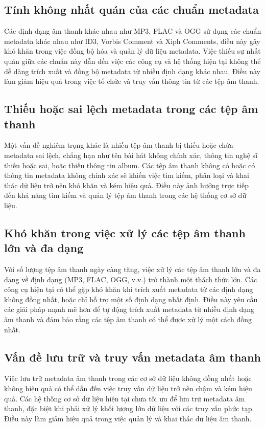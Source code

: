\documentclass[conference]{IEEEtran}
\begin{document}
\subsection{Tính không nhất quán của các chuẩn metadata}

Các định dạng âm thanh khác nhau như MP3, FLAC và OGG sử dụng các chuẩn metadata khác nhau như ID3, Vorbis Comment và Xiph Comments, điều này gây khó khăn trong việc đồng bộ hóa và quản lý dữ liệu metadata. Việc thiếu sự nhất quán giữa các chuẩn này dẫn đến việc các công cụ và hệ thống hiện tại không thể dễ dàng trích xuất và đồng bộ metadata từ nhiều định dạng khác nhau. Điều này làm giảm hiệu quả trong việc tổ chức và truy vấn thông tin từ các tệp âm thanh.

\subsection{Thiếu hoặc sai lệch metadata trong các tệp âm thanh}

Một vấn đề nghiêm trọng khác là nhiều tệp âm thanh bị thiếu hoặc chứa metadata sai lệch, chẳng hạn như tên bài hát không chính xác, thông tin nghệ sĩ thiếu hoặc sai, hoặc thiếu thông tin album. Các tệp âm thanh không có hoặc có thông tin metadata không chính xác sẽ khiến việc tìm kiếm, phân loại và khai thác dữ liệu trở nên khó khăn và kém hiệu quả. Điều này ảnh hưởng trực tiếp đến khả năng tìm kiếm và quản lý tệp âm thanh trong các hệ thống cơ sở dữ liệu.

\subsection{Khó khăn trong việc xử lý các tệp âm thanh lớn và đa dạng}

Với số lượng tệp âm thanh ngày càng tăng, việc xử lý các tệp âm thanh lớn và đa dạng về định dạng (MP3, FLAC, OGG, v.v.) trở thành một thách thức lớn. Các công cụ hiện tại có thể gặp khó khăn khi trích xuất metadata từ các định dạng không đồng nhất, hoặc chỉ hỗ trợ một số định dạng nhất định. Điều này yêu cầu các giải pháp mạnh mẽ hơn để tự động trích xuất metadata từ nhiều định dạng âm thanh và đảm bảo rằng các tệp âm thanh có thể được xử lý một cách đồng nhất.

\subsection{Vấn đề lưu trữ và truy vấn metadata âm thanh}

Việc lưu trữ metadata âm thanh trong các cơ sở dữ liệu không đồng nhất hoặc không hiệu quả có thể dẫn đến việc truy vấn dữ liệu trở nên chậm và kém hiệu quả. Các hệ thống cơ sở dữ liệu hiện tại chưa tối ưu để lưu trữ metadata âm thanh, đặc biệt khi phải xử lý khối lượng lớn dữ liệu với các truy vấn phức tạp. Điều này làm giảm hiệu quả trong việc quản lý và khai thác dữ liệu âm thanh.
\end{document}
